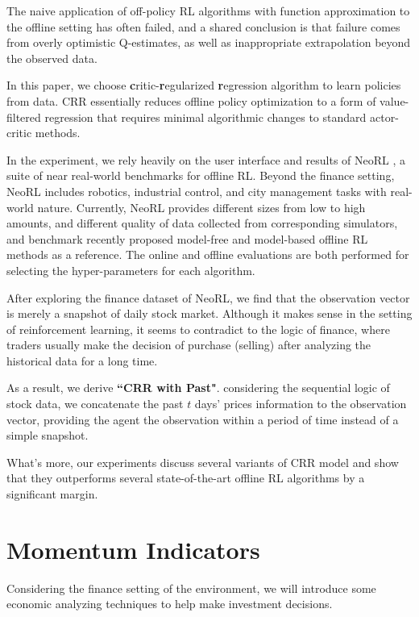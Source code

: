 \documentclass[nohyperref]{article}
\theoremstyle{plain}
\theoremstyle{definition}
\theoremstyle{remark}
\begin{document}
The naive application of off-policy RL algorithms with function approximation to the offline setting has often failed, and a shared conclusion is that failure comes from overly optimistic Q-estimates, as well as inappropriate extrapolation beyond the observed data. 

In this paper, we choose \textbf{c}ritic-\textbf{r}egularized \textbf{r}egression \cite{2006.15134} algorithm to learn policies from data. CRR essentially reduces offline policy optimization to a form of value-filtered regression that requires minimal algorithmic changes to standard actor-critic methods.

In the experiment, we rely heavily on the user interface and results of NeoRL \cite{2102.00714}, a suite of near real-world benchmarks for offline RL. Beyond the finance setting, NeoRL includes robotics, industrial control, and city management tasks with real-world nature. Currently, NeoRL provides different sizes from low to high amounts, and different quality of data collected from corresponding simulators, and benchmark recently proposed model-free and model-based offline RL methods as a reference. The online and offline evaluations are both performed for selecting the hyper-parameters for each algorithm.

After exploring the finance dataset of NeoRL, we find that the observation vector is merely a snapshot of daily stock market. Although it makes sense in the setting of reinforcement learning, it seems to contradict to the logic of finance, where traders usually make the decision of purchase (selling) after analyzing the historical data for a long time. 

As a result, we derive \textbf{``CRR with Past"}. considering the sequential logic of stock data, we concatenate the past $t$ days' prices information to the observation vector, providing the agent the observation within a period of time instead of a simple snapshot. 

What's more, our experiments discuss several variants of CRR model and show that they outperforms several state-of-the-art offline RL algorithms by a significant margin.

\section{Momentum Indicators}


Considering the finance setting of the environment, we will introduce some economic analyzing techniques to help make investment decisions\cite{2011.09607}. 
\end{document}
